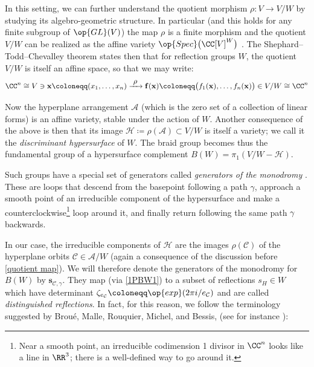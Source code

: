 In this setting, we can further understand the quotient morphism $\rho:V\rightarrow V/W$ by studying its algebro-geometric structure. In particular (and this holds for any finite subgroup of $\op{GL}(V)$) the map $\rho$ is a finite morphism and the quotient $V/W$ can be realized as the affine variety $\op{Spec}\big(\CC[V]^W\big)$ \cite[Exer.~13.2-4 and Sec.~1.7]{eisenbud-commutative-algebra}. The Shephard--Todd--Chevalley theorem states then that for reflection groups $W$, the quotient $V/W$ is itself an affine space, so that we may write: 
\begin{equation}\label{quotient map}
\CC^n\cong V\ni{\bf x}\coloneqq (x_1,\ldots,x_n)\xrightarrow{\ \displaystyle\rho\ } {\bf f}({\bf x})\coloneqq \big(f_1({\bf x}),\ldots,f_n({\bf x})\big)\in V/W\cong \CC^n
\end{equation}

Now the hyperplane arrangement $\mathcal{A}$ (which is the zero set of a collection of linear forms) is an affine variety, stable under the action of $W$. Another consequence of the above is then that its image $\mathcal{H}\coloneqq \rho(\mathcal{A})\subset V/W$ is itself a variety; we call it the {\it discriminant hypersurface} of $W$. The braid group becomes thus the fundamental group of a hypersurface complement $B(W)=\pi_1(V/W-\mathcal{H})$.

Such groups have a special set of generators called {\it generators of the monodromy} \cite[Appendix~1]{broue-malle-rouquier-braid-hecke}. These are loops that descend from the basepoint following a path $\gamma$, approach a smooth point of an irreducible component of the hypersurface and make a counterclockwise\footnote{Near a smooth point, an irreducible codimension 1 divisor in $\CC^n$ looks like a line in $\RR^3$; there is a well-defined way to go around it.} loop around it, and finally return following the same path $\gamma$ backwards. 

In our case, the irreducible components of $\mathcal{H}$ are the images $\rho(\mathcal{C})$ of the hyperplane orbits $\mathcal{C}\in\mathcal{A}/W$ (again a consequence of the discussion before \eqref{quotient map}). We will therefore denote the generators of the monodromy for $B(W)$ by $\bm s_{\mathcal{C},\gamma}$. They map (via \eqref{1PBW1}) to a subset of reflections $s_H\in W$ which have determinant $\zeta_{e_{\mathcal{C}}}\coloneqq \op{exp}(2\pi i/e_{\mathcal{C}})$ and are called {\it distinguished reflections}. In fact, for this reason, we follow the terminology suggested by Brou{\'e}, Malle, Rouquier, Michel, and Bessis, (see for instance \cite[Defn.~1.6]{bes-kpi1}):

